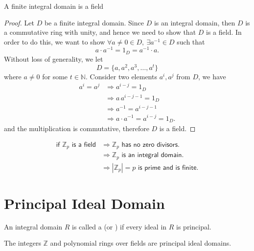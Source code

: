 \begin{theorem}
    A finite integral domain is a field
\end{theorem}
\begin{proof}
    Let $D$ be a finite integral domain. Since $D$ is an integral domain, then $D$ is a commutative 
    ring with unity, and hence we need to show that $D$ is a field. In order to do this, we 
    want to show $\forall a \neq 0 \in D, \> \exists a^{-1} \in D$ such that 
    \[
        a \cdot a^{-1} = 1_D = a^{-1} \cdot a.
    \]
    Without loss of generality, we let 
    \[
        D = \{ a, a^2, a^3, \ldots, a^t \} 
    \]
    where $a \neq 0$ for some $t \in \mathbb{N}$. Consider two elements $a^i, a^j$ from $D$, we have 
    \begin{align*}
        a^i = a^j &\Rightarrow a^{i-j} = 1_D\\
        &\Rightarrow a\, a^{i-j-1} = 1_D\\
        &\Rightarrow a^{-1} = a^{i-j-1}\\
        &\Rightarrow a \cdot a^{-1} = a^{i-j} = 1_D.
    \end{align*}
    and the multiplication is commutative, therefore $D$ is a field.
\end{proof}
\begin{remark}
    \begin{align*}
        \textsf{if } \mathbb{Z}_p \textsf{ is a field} &\Longrightarrow \mathbb{Z}_p \textsf{ has no zero divisors.}\\
        &\Longrightarrow \mathbb{Z}_p \textsf{ is an integral domain.}\\
        &\Longrightarrow |\mathbb{Z}_p| = p \textsf{ is prime and is finite.}
    \end{align*}
\end{remark}

\section{Principal Ideal Domain}

\begin{definition}
    An integral domain $R$ is called a  (or ) if every ideal in $R$ is principal.
\end{definition}

\begin{example}
    The integers $\mathbb{Z}$ and polynomial rings over fields are principal ideal domains.
\end{example}

